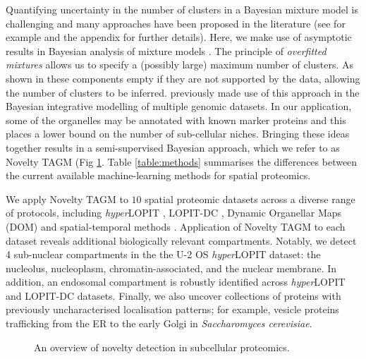 \documentclass[12pt,english]{article}
\begin{document}
Quantifying uncertainty in the number of clusters in a Bayesian mixture model is challenging and many approaches have been proposed in the literature (see for example \cite{ferguson::1974, antoniak::1974, Richardson::1997} and the appendix for further details). Here, we make use of asymptotic results in Bayesian analysis of mixture models \citep{Rousseau::2011}. The principle of \textit{overfitted mixtures} allows us to specify a (possibly large) maximum number of clusters. As shown in \cite{Rousseau::2011} these components empty if they are not supported by the data, allowing the number of clusters to be inferred. \cite{Kirk:2012} previously made use of this approach in the Bayesian integrative modelling of multiple genomic datasets. In our application, some of the organelles may be annotated with known marker proteins and this places a lower bound on the number of sub-cellular niches. Bringing these ideas together results in a semi-supervised Bayesian approach, which we refer to as Novelty TAGM (Fig \ref{figure:overview}. Table \ref{table:methods} summarises the differences between the current available machine-learning methods for spatial proteomics.

We apply Novelty TAGM to $10$ spatial proteomic datasets across a diverse range of protocols, including \textit{hyper}LOPIT \citep{hyper, Mulvey:2017}, LOPIT-DC \citep{DC:2018}, Dynamic Organellar Maps (DOM) \citep{Itzhak:2016} and spatial-temporal methods \citep{Jean_Beltran:2016}. Application of Novelty TAGM to each dataset reveals additional biologically relevant compartments. Notably, we detect 4 sub-nuclear compartments in the the U-2 OS \textit{hyper}LOPIT dataset: the nucleolus,  nucleoplasm, chromatin-associated, and the nuclear membrane. In addition, an endosomal compartment is robustly identified across \textit{hyper}LOPIT and LOPIT-DC datasets. Finally, we also uncover collections of proteins with previously uncharacterised localisation patterns; for example, vesicle proteins trafficking from the ER to the early Golgi in \textit{Saccharomyces cerevisiae}.

\begin{figure}[h]
	
	\centering
	\caption{An overview of novelty detection in subcellular proteomics.}
	\label{figure:overview}
\end{figure}
\end{document}
